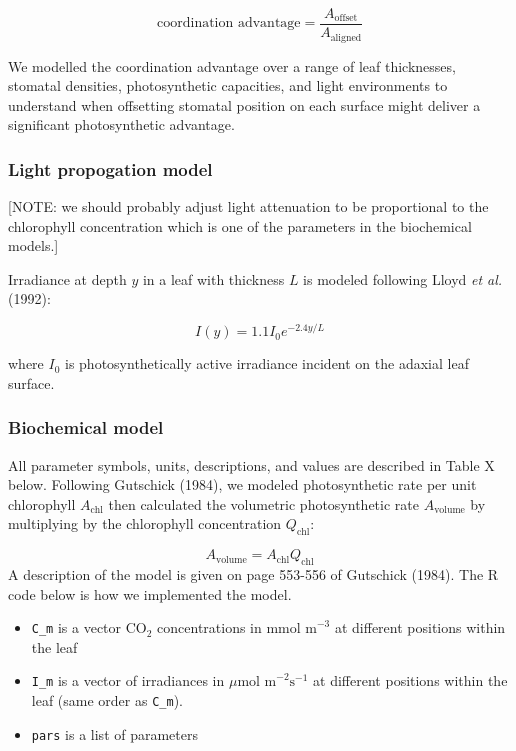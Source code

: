 \documentclass[12pt,halfline,a4paper,]{ouparticle}
\providecommand{\tightlist}{%
  \setlength{\itemsep}{0pt}\setlength{\parskip}{0pt}}
\begin{document}
\begin{equation} \label{eq:coordination_advantage}
  \text{coordination advantage} = \frac{A_\text{offset}}{A_\text{aligned}}
\end{equation}

We modelled the coordination advantage over a range of leaf thicknesses,
stomatal densities, photosynthetic capacities, and light environments to
understand when offsetting stomatal position on each surface might
deliver a significant photosynthetic advantage.

\hypertarget{light-propogation-model}{%
\subsubsection{Light propogation model}\label{light-propogation-model}}

{[}NOTE: we should probably adjust light attenuation to be proportional
to the chlorophyll concentration which is one of the parameters in the
biochemical models.{]}

Irradiance at depth \(y\) in a leaf with thickness \(L\) is modeled
following Lloyd \emph{et al.} (1992):

\begin{equation}\label{eq:light_propogation}
  I(y) = 1.1 I_0 e ^ {-2.4 y / L}
\end{equation}

where \(I_0\) is photosynthetically active irradiance incident on the
adaxial leaf surface.

\hypertarget{biochemical-model}{%
\subsubsection{Biochemical model}\label{biochemical-model}}

All parameter symbols, units, descriptions, and values are described in
Table X below. Following Gutschick (1984), we modeled photosynthetic
rate per unit chlorophyll \(A_\text{chl}\) then calculated the
volumetric photosynthetic rate \(A_\text{volume}\) by multiplying by the
chlorophyll concentration \(Q_\text{chl}\):

\[A_\text{volume} = A_\text{chl} Q_\text{chl}\] A description of the
model is given on page 553-556 of Gutschick (1984). The R code below is
how we implemented the model.

\begin{itemize}
\tightlist
\item
  \texttt{C\_m} is a vector CO\(_2\) concentrations in
  \(\text{mmol m}^{-3}\) at different positions within the leaf
\item
  \texttt{I\_m} is a vector of irradiances in
  \(\mu \text{mol m}^{-2} \text{s}^{-1}\) at different positions within
  the leaf (same order as \texttt{C\_m}).
\item
  \texttt{pars} is a list of parameters
\end{itemize}
\end{document}
